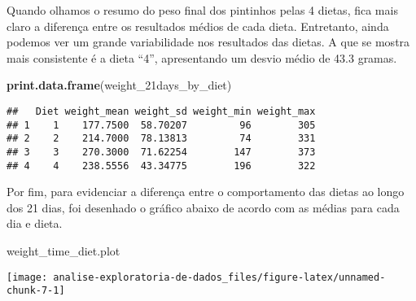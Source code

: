 \documentclass[]{article}
\newenvironment{Shaded}{\begin{snugshade}}{\end{snugshade}}
\newcommand{\KeywordTok}[1]{\textcolor[rgb]{0.13,0.29,0.53}{\textbf{#1}}}
\newcommand{\NormalTok}[1]{#1}
\begin{document}
Quando olhamos o resumo do peso final dos pintinhos pelas 4 dietas, fica
mais claro a diferença entre os resultados médios de cada dieta.
Entretanto, ainda podemos ver um grande variabilidade nos resultados das
dietas. A que se mostra mais consistente é a dieta ``4'', apresentando
um desvio médio de 43.3 gramas.

\begin{Shaded}
\begin{Highlighting}[]
\KeywordTok{print.data.frame}\NormalTok{(weight_21days_by_diet)}
\end{Highlighting}
\end{Shaded}

\begin{verbatim}
##   Diet weight_mean weight_sd weight_min weight_max
## 1    1    177.7500  58.70207         96        305
## 2    2    214.7000  78.13813         74        331
## 3    3    270.3000  71.62254        147        373
## 4    4    238.5556  43.34775        196        322
\end{verbatim}

Por fim, para evidenciar a diferença entre o comportamento das dietas ao
longo dos 21 dias, foi desenhado o gráfico abaixo de acordo com as
médias para cada dia e dieta.

\begin{Shaded}
\begin{Highlighting}[]
\NormalTok{weight_time_diet.plot}
\end{Highlighting}
\end{Shaded}

\begin{center}\texttt{[image: analise-exploratoria-de-dados\_files/figure-latex/unnamed-chunk-7-1]} \end{center}
\end{document}
